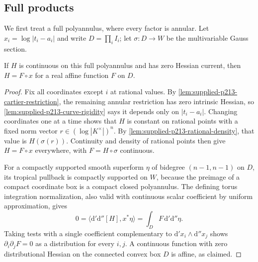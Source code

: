 \subsection{Full products}\label{sec:supplied-p213-products}

We first treat a full polyannulus, where every factor is annular. Let $x_i=\log|t_i-a_i|$ and write $D=\prod_i I_i$; let $\sigma:D\to W$ be the multivariable Gauss section.

\begin{proposition}\label{prop:supplied-p213-polyannulus}
If $H$ is continuous on this full polyannulus and has zero Hessian current, then $H=F\circ x$ for a real affine function $F$ on $D$.
\end{proposition}

\begin{proof}
Fix all coordinates except $i$ at rational values. By \cref{lem:supplied-p213-cartier-restriction}, the remaining annular restriction has zero intrinsic Hessian, so \cref{lem:supplied-p213-curve-rigidity} says it depends only on $|t_i-a_i|$. Changing coordinates one at a time shows that $H$ is constant on rational points with a fixed norm vector $r\in(\log|K^\times|)^n$. By \cref{lem:supplied-p213-rational-density}, that value is $H(\sigma(r))$. Continuity and density of rational points then give $H=F\circ x$ everywhere, with $F=H\circ\sigma$ continuous.

For a compactly supported smooth superform $\eta$ of bidegree $(n-1,n-1)$ on $D$, its tropical pullback is compactly supported on $W$, because the preimage of a compact coordinate box is a compact closed polyannulus. The defining torus integration normalization, also valid with continuous scalar coefficient by uniform approximation, gives
\[
 0=\langle\mathrm d'\mathrm d''[H],x^*\eta\rangle
   =\int_D F\,\mathrm d'\mathrm d''\eta.
\]
Taking tests with a single coefficient complementary to $\mathrm d'x_i\wedge\mathrm d''x_j$ shows $\partial_i\partial_jF=0$ as a distribution for every $i,j$. A continuous function with zero distributional Hessian on the connected convex box $D$ is affine, as claimed.
\end{proof}

